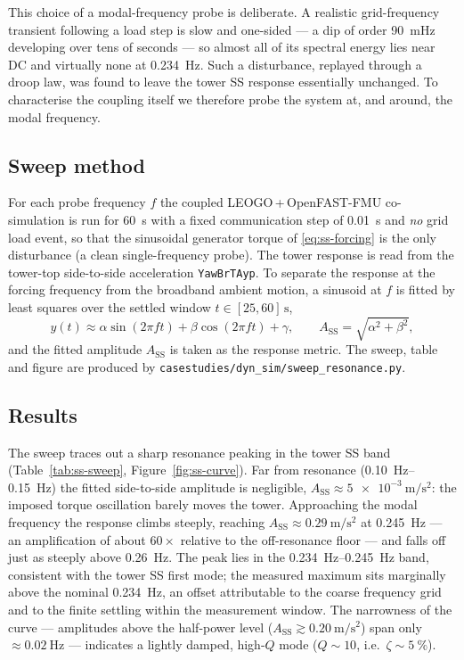 This choice of a modal-frequency probe is deliberate. A realistic
grid-frequency transient following a load step is slow and one-sided --- a dip
of order \SI{90}{\milli\hertz} developing over tens of seconds --- so almost all
of its spectral energy lies near DC and virtually none at \SI{0.234}{\hertz}.
Such a disturbance, replayed through a droop law, was found to leave the tower SS
response essentially unchanged. To characterise the coupling itself we therefore
probe the system at, and around, the modal frequency.

\subsection{Sweep method}
\label{subsec:ss-method}

For each probe frequency \(f\) the coupled LEOGO\,+\,OpenFAST-FMU co-simulation
is run for \SI{60}{\second} with a fixed communication step of
\SI{0.01}{\second} and \emph{no} grid load event, so that the sinusoidal
generator torque of \eqref{eq:ss-forcing} is the only disturbance (a clean
single-frequency probe). The tower response is read from the tower-top
side-to-side acceleration \texttt{YawBrTAyp}. To separate the response at the
forcing frequency from the broadband ambient motion, a sinusoid at \(f\) is
fitted by least squares over the settled window \(t \in [25,60]\,\si{\second}\),
\begin{equation}
  y(t) \approx \alpha\sin(2\pi f t) + \beta\cos(2\pi f t) + \gamma,
  \qquad
  A_{\mathrm{SS}} = \sqrt{\alpha^2 + \beta^2},
  \label{eq:ss-fit}
\end{equation}
and the fitted amplitude \(A_{\mathrm{SS}}\) is taken as the response metric.
The sweep, table and figure are produced by
\texttt{casestudies/dyn\_sim/sweep\_resonance.py}.

\subsection{Results}
\label{subsec:ss-results}

The sweep traces out a sharp resonance peaking in the tower SS band
(Table~\ref{tab:ss-sweep}, Figure~\ref{fig:ss-curve}). Far from resonance
(\SIrange{0.10}{0.15}{\hertz}) the fitted side-to-side amplitude is negligible,
\(A_{\mathrm{SS}} \approx \SI{5e-3}{\metre\per\second\squared}\): the imposed
torque oscillation barely moves the tower. Approaching the modal frequency the
response climbs steeply, reaching \(A_{\mathrm{SS}} \approx
\SI{0.29}{\metre\per\second\squared}\) at \SI{0.245}{\hertz} --- an amplification
of about \(60\times\) relative to the off-resonance floor --- and falls off just
as steeply above \SI{0.26}{\hertz}. The peak lies in the
\SIrange{0.234}{0.245}{\hertz} band, consistent with the tower SS first mode; the
measured maximum sits marginally above the nominal \SI{0.234}{\hertz}, an offset
attributable to the coarse frequency grid and to the finite settling within the
measurement window. The narrowness of the curve --- amplitudes above the
half-power level (\(A_{\mathrm{SS}} \gtrsim \SI{0.20}{\metre\per\second\squared}\))
span only \(\approx\SI{0.02}{\hertz}\) --- indicates a lightly damped, high-\(Q\)
mode (\(Q \sim 10\), i.e.\ \(\zeta \sim \SI{5}{\percent}\)).

